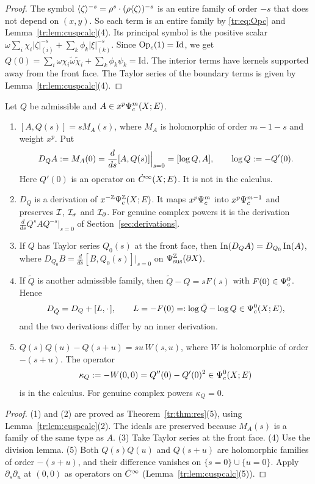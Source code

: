 \begin{proof}
The symbol \(\langle \zeta\rangle^{-s}=\rho^{s}\cdot(\rho\langle \zeta\rangle)^{-s}\) is an
entire family of order \(-s\) that does not depend on \((x,y)\). So each term
is an entire family by \eqref{tr:eq:Opc} and
Lemma~\ref{tr:lem:cuspcalc}(4). Its principal symbol is the positive scalar
\(\omega\sum_i\chi_i|\zeta|_{(i)}^{-s}+\sum_k\phi_k|\xi|_{(k)}^{-s}\).
Since \(\operatorname{Op}_c(1)=\mathrm{Id}\), we get \(Q(0)=\sum_i\omega\chi_i
\tilde\omega\tilde\chi_i+\sum_k\phi_k\psi_k=\mathrm{Id}\). The interior terms
have kernels supported away from the front face. The Taylor series of
the boundary terms is given by Lemma~\ref{tr:lem:cuspcalc}(4).
\end{proof}

\begin{proposition}\label{tr:prop:DQ}
Let \(Q\) be admissible and \(A\in x^p\Psi_{c}^m(X;E)\).
\begin{enumerate}
\item \([A,Q(s)]=sM_A(s)\), where \(M_A\) is holomorphic of order
\(m-1-s\) and weight \(x^p\). Put
\[
 D_QA:=M_A(0)=\frac{d}{ds}[A,Q(s)]\Big|_{s=0}=[\log Q,A],\qquad
 \log Q:=-Q'(0).
\]
Here \(Q'(0)\) is an operator on \(\dot C^\infty(X;E)\). It is not in the calculus.
\item \(D_Q\) is a derivation of \(x^{-\mathbb Z}\Psi_{c}^{\mathbb Z}(X;E)\). It maps
\(x^p\Psi_{c}^m\) into \(x^p\Psi_{c}^{m-1}\) and preserves \(\mathcal I\), \(\mathcal I_\sigma\) and
\(\mathcal I_\partial\). For genuine complex powers it is the derivation
\(\frac{d}{ds}Q^sAQ^{-s}|_{s=0}\) of Section~\ref{sec:derivations}.
\item If \(Q\) has Taylor series \(Q_0(s)\) at the front face, then
\(\operatorname{In}(D_QA)=D_{Q_0}\operatorname{In}(A)\), where \(D_{Q_0}B=\frac{d}{ds}[B,Q_0(s)]|_{s=0}\)
on \(\Psi_{\mathrm{sus}}^{\mathbb Z}(\partial X)\).
\item If \(\tilde Q\) is another admissible family, then \(\tilde Q-Q=sF(s)\)
with \(F(0)\in\Psi_{c}^0\). Hence
\[
 D_{\tilde Q}=D_Q+[L,\cdot\,],\qquad L=-F(0)=:\log\tilde Q-\log Q\in
 \Psi_{c}^0(X;E),
\]
and the two derivations differ by an inner derivation.
\item \(Q(s)Q(u)-Q(s+u)=su\,W(s,u)\), where \(W\) is holomorphic of order
\(-(s+u)\). The operator
\[
 \kappa_Q:=-W(0,0)=Q''(0)-Q'(0)^2\in\Psi_{c}^0(X;E)
\]
is in the calculus. For genuine complex powers \(\kappa_Q=0\).
\end{enumerate}
\end{proposition}

\begin{proof}
(1) and (2) are proved as Theorem~\ref{tr:thm:res}(5), using
Lemma~\ref{tr:lem:cuspcalc}(2). The ideals are preserved because \(M_A(s)\)
is a family of the same type as \(A\). (3) Take Taylor series at the front
face. (4) Use the division lemma. (5) Both \(Q(s)Q(u)\) and \(Q(s+u)\) are
holomorphic families of order \(-(s+u)\), and their difference vanishes on
\(\{s=0\}\cup\{u=0\}\). Apply \(\partial_s\partial_u\) at \((0,0)\) as
operators on \(\dot C^\infty\) (Lemma~\ref{tr:lem:cuspcalc}(5)).
\end{proof}


